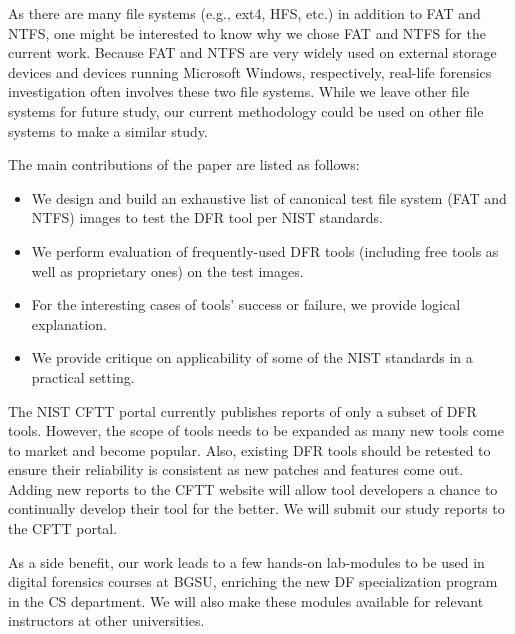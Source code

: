 As there are many file systems (e.g., ext4, HFS, etc.) in addition to FAT and NTFS, one might be interested to know why we chose FAT and NTFS for the current work. 
Because FAT and NTFS are very widely used on external storage devices and devices running Microsoft Windows, respectively,
real-life forensics investigation often involves these two file systems.
While we leave other file systems for future study, our current methodology could be 
used on other file systems to make a similar study.

The main contributions of the paper are listed as follows:
\begin{itemize}
\item We design and build an exhaustive list of canonical test file system (FAT and NTFS) images to test the DFR tool per NIST standards. 
\item We perform evaluation of frequently-used DFR tools (including free tools as well as proprietary ones) on the test images.
\item For the interesting cases of tools' success or failure, we provide logical explanation.
\item We provide critique on applicability of some of the NIST standards in a practical setting. 
\end{itemize}


The NIST CFTT portal currently publishes reports of only a subset of DFR tools. 
However, the scope of tools needs to be expanded as many new tools come to market and become popular.
Also, existing DFR tools should be retested to ensure their reliability is consistent 
as new patches and features come out. 
Adding new reports to the CFTT website will allow tool developers a 
chance to continually develop their tool for the better. We will submit our study reports to the CFTT portal.

As a side benefit, our work leads to a few hands-on lab-modules to be used in digital forensics courses 
at BGSU, enriching the new DF specialization program in the CS department. We will also make these modules
available for relevant instructors at other universities.

